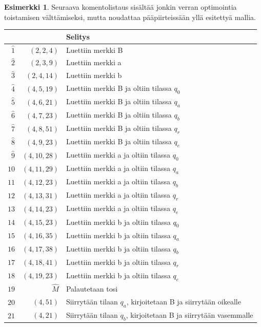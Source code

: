 \documentclass[a4paper, 12pt]{article}
\theoremstyle{definition}
\newtheorem{example}[mydef]{Esimerkki}
\theoremstyle{plain}
\begin{document}
\begin{example}
Seuraava komentolistaus sisältää jonkin verran optimointia toistamisen välttämiseksi, mutta noudattaa pääpiirteissään yllä esitettyä mallia.
\\
\begin{center}
\begin{tabular}[t]{r|r|l}
& & Selitys\\
\hline
$\hat{1}$ & $(2, 2, 4)$  & Luettiin merkki B \\
$\hat{2}$ & $(2, 3, 9)$  & Luettiin merkki a \\
$\hat{3}$ & $(2, 4, 14)$  & Luettiin merkki b \\
$\hat{4}$ & $(4, 5, 19)$  & Luettiin merkki B ja oltiin tilassa $q_0$ \\
$\hat{5}$ & $(4, 6, 21)$  & Luettiin merkki B ja oltiin tilassa $q_a$ \\
$\hat{6}$ & $(4, 7, 23)$  & Luettiin merkki B ja oltiin tilassa $q_b$ \\
$\hat{7}$ & $(4, 8, 51)$  & Luettiin merkki B ja oltiin tilassa $q_r$ \\
$\hat{8}$ & $(4, 9, 23)$  & Luettiin merkki B ja oltiin tilassa $q_e$ \\
$\hat{9}$ & $(4, 10, 28)$  & Luettiin merkki a ja oltiin tilassa $q_0$ \\
$\hat{10}$ & $(4, 11, 29)$  & Luettiin merkki a ja oltiin tilassa $q_a$ \\
$\hat{11}$ & $(4, 12, 23)$  & Luettiin merkki a ja oltiin tilassa $q_b$ \\
$\hat{12}$ & $(4, 13, 31)$  & Luettiin merkki a ja oltiin tilassa $q_r$ \\
$\hat{13}$ & $(4, 14, 23)$  & Luettiin merkki a ja oltiin tilassa $q_e$ \\
$\hat{14}$ & $(4, 15, 23)$  & Luettiin merkki b ja oltiin tilassa $q_0$ \\
$\hat{15}$ & $(4, 16, 35)$  & Luettiin merkki b ja oltiin tilassa $q_a$ \\
$\hat{16}$ & $(4, 17, 38)$  & Luettiin merkki b ja oltiin tilassa $q_b$ \\
$\hat{17}$ & $(4, 18, 41)$  & Luettiin merkki b ja oltiin tilassa $q_r$ \\
$\hat{18}$ & $(4, 19, 23)$  & Luettiin merkki b ja oltiin tilassa $q_e$ \\
$\hat{19}$ & $\hat{M}$  & Palautetaan tosi \\
$\hat{20}$ & $(4, 51)$  & Siirrytään tilaan $q_a$, kirjoitetaan B ja siirrytään oikealle\\
$\hat{21}$ & $(4, 21)$  & Siirrytään tilaan $q_b$, kirjoitetaan B ja siirrytään vasemmalle\\

\end{tabular}
\end{center}
\end{example}
\end{document}
